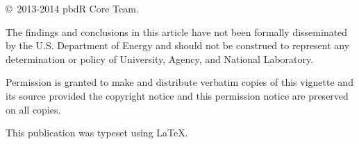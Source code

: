 \null
\vfill
\copyright\ 2013-2014 pbdR Core Team.

The findings and conclusions in this article have not been
formally disseminated by the U.S. Department of Energy
and should not be construed to represent any determination or
policy of University, Agency, and National Laboratory.

Permission is granted to make and distribute verbatim copies of
this vignette and its source provided the copyright notice and
this permission notice are preserved on all copies.

This publication was typeset using \LaTeX.
